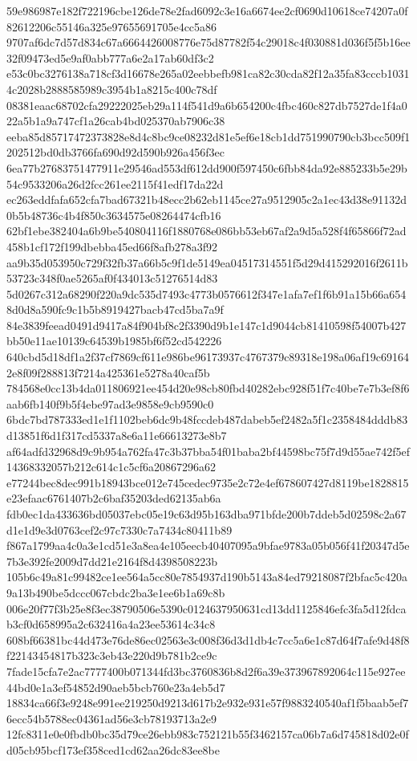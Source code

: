 \documentclass[11pt,a4paper]{article}
\begin{document}
{59e986987e182f722196cbe126de78e2fad6092c3e16a6674ee2cf0690d10618ce74207a0f82612206c55146a325e97655691705e4cc5a86
9707af6dc7d57d834c67a6664426008776e75d87782f54c29018c4f030881d036f5f5b16ee32f09473ed5e9af0abb777a6e2a17ab60df3c2
e53c0bc3276138a718cf3d16678e265a02eebbefb981ca82c30cda82f12a35fa83cccb10314c2028b2888585989c3954b1a8215c400c78df
08381eaac68702cfa29222025eb29a114f541d9a6b654200c4fbc460c827db7527de1f4a022a5b1a9a747cf1a26cab4bd025370ab7906c38
eeba85d85717472373828e8d4c8bc9ce08232d81e5ef6e18cb1dd751990790cb3bcc509f1202512bd0db3766fa690d92d590b926a456f3ec
6ea77b27683751477911e29546ad553df612dd900f597450c6fbb84da92e885233b5e29b54c9533206a26d2fcc261ee2115f41edf17da22d
ec263eddfafa652cfa7bad67321b48ecc2b62eb1145ce27a9512905c2a1ec43d38e91132d0b5b48736c4b4f850c3634575e08264474cfb16
62bf1ebe382404a6b9be540804116f1880768e086bb53eb67af2a9d5a528f4f65866f72ad458b1cf172f199dbebba45ed66f8afb278a3f92
aa9b35d053950c729f32fb37a66b5c9f1de5149ea04517314551f5d29d415292016f2611b53723c348f0ae5265af0f434013c51276514d83
5d0267c312a68290f220a9dc535d7493c4773b0576612f347e1afa7ef1f6b91a15b66a6548d0d8a590fc9c1b5b8919427bacb47cd5ba7a9f
84e3839feead0491d9417a84f904bf8c2f3390d9b1e147c1d9044cb81410598f54007b427bb50e11ae10139c64539b1985bf6f52cd542226
640cbd5d18df1a2f37cf7869cf611e986be96173937c4767379c89318e198a06af19c691642e8f09f288813f7214a425361e5278a40caf5b
784568e0cc13b4da011806921ee454d20e98cb80fbd40282ebc928f51f7c40be7e7b3ef8f6aab6fb140f9b5f4ebe97ad3e9858e9cb9590c0
6bdc7bd787333ed1e1f1102beb6dc9b48fccdeb487dabeb5ef2482a5f1c2358484dddb83d13851f6d1f317cd5337a8e6a11e66613273e8b7
af64adfd32968d9c9b954a762fa47c3b37bba54f01baba2bf44598bc75f7d9d55ae742f5ef14368332057b212c614c1c5cf6a20867296a62
e77244bec8dec991b18943bce012e745cedec9735e2c72e4ef678607427d8119be1828815e23efaac6761407b2c6baf35203ded62135ab6a
fdb0ec1da433636bd05037ebc05e19c63d95b163dba971bfde200b7ddeb5d02598c2a67d1e1d9e3d0763cef2c97c7330c7a7434c80411b89
f867a1799aa4c0a3e1cd51e3a8ea4e105eecb40407095a9bfae9783a05b056f41f20347d5e7b3e392fe2009d7dd21e2164f8d4398508223b
105b6c49a81c99482ce1ee564a5cc80e7854937d190b5143a84ed79218087f2bfac5c420a9a13b490be5dccc067cbdc2ba3e1ee6b1a69c8b
006e20f77f3b25e8f3ec38790506e5390c0124637950631cd13dd1125846efc3fa5d12fdcab3cf0d658995a2c632416a4a23ee53614c34c8
608bf66381bc44d473e76de86ec02563e3c008f36d3d1db4c7cc5a6e1c87d64f7afe9d48f8f22143454817b323c3eb43e220d9b781b2ce9c
7fade15cfa7e2ac7777400b071344fd3bc3760836b8d2f6a39e373967892064c115e927ee44bd0e1a3ef54852d90aeb5bcb760e23a4eb5d7
18834ca66f3e9248e991ee219250d9213d617b2e932e931e57f9883240540af1f5baab5ef76ecc54b5788ec04361ad56e3cb78193713a2e9
12fc8311e0e0fbdb0bc35d79ce26ebb983c752121b55f3462157ca06b7a6d745818d02e0fd05cb95bcf173ef358ced1cd62aa26dc83ee8be
}
\end{document}
